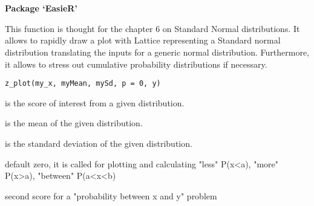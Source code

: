 \documentclass[a4paper]{book}
\begin{document}
\chapter*{}
\begin{center}
{\textbf{\huge Package `EasieR'}}
\par\bigskip{\large \today}
\end{center}
\begin{description}
\raggedright{}
\item[Type]
\item[Title]
\item[Version]
\item[Date]
\item[Depends]
\item[Author]
\item[Maintainer]\AsIs{}\AsIs{}
\item[Description]
\item[License]
\item[LazyData]
\item[NeedsCompilation]
\end{description}
%
\begin{Description}\relax
This function is thought for the chapter 6 on Standard Normal distributions. It allows to rapidly draw a plot with Lattice representing a Standard normal distribution translating the inputs for a generic normal distribution. Furthermore, it allows to stress out cumulative probability distributions if necessary.
\end{Description}
%
\begin{Usage}
\begin{verbatim}
z_plot(my_x, myMean, mySd, p = 0, y)
\end{verbatim}
\end{Usage}
%
\begin{Arguments}
\begin{ldescription}
\item[\code{my\_x}] is the score of interest from a given distribution.

\item[\code{myMean}] is the mean of the given distribution.

\item[\code{mySd}] is the standard deviation of the given distribution.

\item[\code{p}] default zero, it is called for plotting and calculating "less" P(x<a), "more" P(x>a), "between" P(a<x<b)

\item[\code{y}] second score for a "probability between x and y" problem
\end{ldescription}
\end{Arguments}
\end{document}
